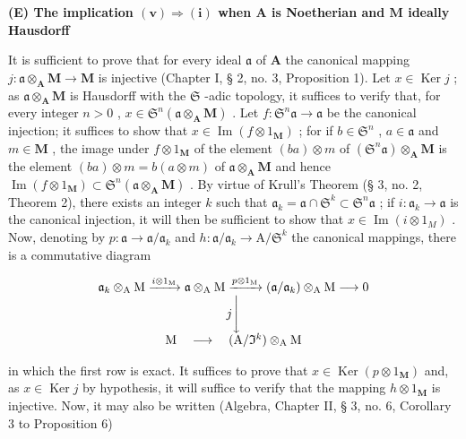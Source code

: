 \textbf{(E) The implication \((\mathbf{v})\Rightarrow (\mathbf{i})\) when \(\mathbf{A}\) is Noetherian and \(\mathbf{M}\) ideally Hausdorff}\par

It is sufficient to prove that for every ideal \(\mathfrak{a}\) of \(\mathbf{A}\) the canonical mapping \(j\colon \mathfrak{a} \otimes_{\mathbf{A}} \mathbf{M} \to \mathbf{M}\) is injective (Chapter I, § 2, no. 3, Proposition 1). Let \(x \in \operatorname{Ker} j\) ; as \(\mathfrak{a} \otimes_{\mathbf{A}} \mathbf{M}\) is Hausdorff with the \(\mathfrak{S}\) -adic topology, it suffices to verify that, for every integer \(n > 0\) , \(x \in \mathfrak{S}^n(\mathfrak{a} \otimes_{\mathbf{A}} \mathbf{M})\) . Let \(f\colon \mathfrak{S}^n\mathfrak{a} \to \mathfrak{a}\) be the canonical injection; it suffices to show that \(x \in \operatorname{Im}(f \otimes 1_{\mathbf{M}})\) ; for if \(b \in \mathfrak{S}^n\) , \(a \in \mathfrak{a}\) and \(m \in \mathbf{M}\) , the image under \(f \otimes 1_{\mathbf{M}}\) of the element \((ba) \otimes m\) of \((\mathfrak{S}^n\mathfrak{a}) \otimes_{\mathbf{A}} \mathbf{M}\) is the element \((ba) \otimes m = b(a \otimes m)\) of \(\mathfrak{a} \otimes_{\mathbf{A}} \mathbf{M}\) and hence \(\operatorname{Im}(f \otimes 1_{\mathbf{M}}) \subset \mathfrak{S}^n(\mathfrak{a} \otimes_{\mathbf{A}} \mathbf{M})\) . By virtue of Krull's Theorem (§ 3, no. 2, Theorem 2), there exists an integer \(k\) such that \(\mathfrak{a}_k = \mathfrak{a} \cap \mathfrak{S}^k \subset \mathfrak{S}^n\mathfrak{a}\) ; if \(i: \mathfrak{a}_k \to \mathfrak{a}\) is the canonical injection, it will then be sufficient to show that \(x \in \operatorname{Im}(i \otimes 1_M)\) . Now, denoting by \(p: \mathfrak{a} \to \mathfrak{a}/\mathfrak{a}_k\) and \(h: \mathfrak{a}/\mathfrak{a}_k \to \mathrm{A}/\mathfrak{S}^k\) the canonical mappings, there is a commutative diagram

\[
\begin{array}{c} \mathfrak {a} _ {k} \otimes_ {\mathrm{A}} \mathrm{M} \xrightarrow {i \otimes 1 _ {\mathrm{M}}} \mathfrak {a} \otimes_ {\mathrm{A}} \mathrm{M} \xrightarrow {p \otimes 1 _ {\mathrm{M}}} (\mathfrak {a} / \mathfrak {a} _ {k}) \otimes_ {\mathrm{A}} \mathrm{M} \longrightarrow 0 \\ j \Biggl \downarrow \\ \mathrm{M} \quad \longrightarrow \quad (\mathrm{A} / \mathfrak {I} ^ {k}) \otimes_ {\mathrm{A}} \mathrm{M} \end{array}
\]

in which the first row is exact. It suffices to prove that \(x \in \operatorname{Ker}(p \otimes 1_{\mathbf{M}})\) and, as \(x \in \operatorname{Ker} j\) by hypothesis, it will suffice to verify that the mapping \(h \otimes 1_{\mathbf{M}}\) is injective. Now, it may also be written (Algebra, Chapter II, § 3, no. 6, Corollary 3 to Proposition 6)

